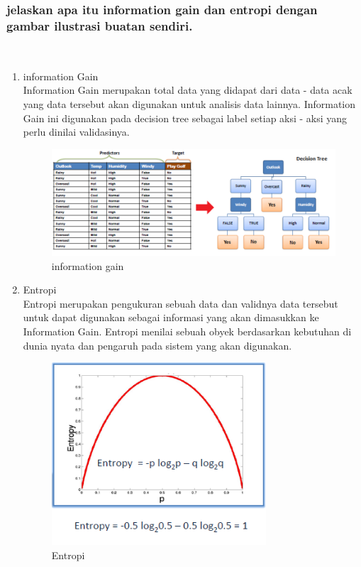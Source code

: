 \subsubsection{jelaskan apa itu information gain dan entropi dengan gambar ilustrasi buatan sendiri.}
\hfill\\
\begin{enumerate}
	\item information Gain
	\hfill\\
	Information Gain merupakan total data yang didapat dari data - data acak yang data tersebut akan digunakan untuk analisis data lainnya. Information Gain ini digunakan pada decision tree sebagai label setiap aksi - aksi yang perlu dinilai validasinya. 
\begin{figure}[H]
    \includegraphics[width=12cm]{figures/1174077/2/ig.png}
    \centering
    \caption{information gain}
\end{figure}

	\item Entropi
	\hfill\\
	Entropi merupakan pengukuran sebuah data dan validnya data tersebut untuk dapat digunakan sebagai informasi yang akan dimasukkan ke Information Gain. Entropi menilai sebuah obyek berdasarkan kebutuhan di dunia nyata dan pengaruh pada sistem yang akan digunakan.
\begin{figure}[H]
    \includegraphics[width=8cm]{figures/1174077/2/e.png}
    \centering
    \caption{Entropi}
\end{figure}
\end{enumerate}



